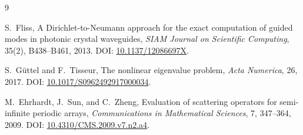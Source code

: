 \documentclass[UTF8,fontset=fandol,11pt,a4paper]{ctexart}
\begin{document}
\begin{thebibliography}{9}

S.~Fliss,
\newblock A Dirichlet-to-Neumann approach for the exact computation of guided modes in photonic crystal waveguides,
\newblock \emph{SIAM Journal on Scientific Computing}, 35(2), B438--B461, 2013.
\newblock DOI: \href{https://doi.org/10.1137/12086697X}{10.1137/12086697X}.

S.~G{\"u}ttel and F.~Tisseur,
\newblock The nonlinear eigenvalue problem,
\newblock \emph{Acta Numerica}, 26, 2017.
\newblock DOI: \href{https://doi.org/10.1017/S0962492917000034}{10.1017/S0962492917000034}.

M.~Ehrhardt, J.~Sun, and C.~Zheng,
\newblock Evaluation of scattering operators for semi-infinite periodic arrays,
\newblock \emph{Communications in Mathematical Sciences}, 7, 347--364, 2009.
\newblock DOI: \href{https://doi.org/10.4310/CMS.2009.v7.n2.a4}{10.4310/CMS.2009.v7.n2.a4}.

\end{thebibliography}
\end{document}
